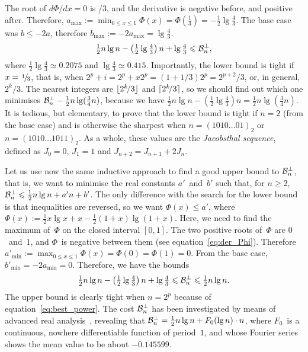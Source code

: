 The root of \(d\Phi/dx = 0\) is /{3}, and the derivative is
negative before, and positive after. Therefore, \(a_{\max} := \min_{0
  \leqslant x \leqslant 1}\Phi(x) = \Phi(\tfrac{1}{3}) =
-\tfrac{1}{2}\lg\tfrac{4}{3}\). The base case was \(b \leqslant -2a\),
therefore \(b_{\max} := -2a_{\max} = \lg\tfrac{4}{3}\).
\begin{equation}
  \tfrac{1}{2}n\lg n - \left(\tfrac{1}{2}\lg\tfrac{4}{3}\right)n + \lg\tfrac{4}{3}
  \leqslant \mathcal{B}_{n}^{\bot},
  \label{ineq:lower_Btms}
\end{equation}
where \(\tfrac{1}{2}\lg\tfrac{4}{3} \simeq 0.2075\) and
\(\lg\tfrac{4}{3} \simeq 0.415\). Importantly, the lower bound is
tight if \(x=\myfrac{1}/{3}\), that is, when
\(2^p+i=2^p+x2^p=(1+1/3)2^p=2^{p+2}\!/3\), or, in general,
\(2^k\!/3\). The nearest integers are \(\lfloor{2^k\!/3}\rfloor\) and
\(\lceil{2^k\!/3}\rceil\), so we should find out which one minimises
\(\mathcal{B}_{n}^{\bot} - \tfrac{1}{2}n\lg(\tfrac{3}{4}n)\), because we have
\(\tfrac{1}{2}n\lg n - \left(\tfrac{1}{2}\lg\tfrac{4}{3}\right)n =
\tfrac{1}{2}n\lg(\tfrac{3}{4}n)\). It is tedious, but elementary, to
prove that the lower bound is tight if \(n=2\) (from the base case)
and is otherwise the sharpest when \(n=(1010\dots01)_2\) or
\(n=(1010\dots1011)_2\). As a whole, these values are the
\emph{Jacobsthal sequence}, defined as \(J_0 = 0\), \(J_1=1\) and
\(J_{n+2} = J_{n+1} + 2J_{n}\).

Let us use now the same inductive approach to find a good upper bound
to \(\mathcal{B}_{n}^{\bot}\), that is, we want to minimise the real constants
\(a'\)~and~\(b'\) such that, for \(n \geqslant 2\), \(\mathcal{B}_{n}^{\bot}
\leqslant \tfrac{1}{2}n\lg n + a'n + b'\). The only difference with
the search for the lower bound is that inequalities are reversed, so
we want \(\Phi(x) \leqslant a'\), where \(\Phi(x) := \tfrac{1}{2}x\lg
x + x - \tfrac{1}{2}(1+x)\lg(1+x)\). Here, we need to find the maximum
of~\(\Phi\) on the closed interval \([0,1]\). The two positive roots
of~\(\Phi\) are \(0\)~and~\(1\), and \(\Phi\)~is negative between them
(see equation~\eqref{eq:der_Phi}). Therefore \(a'_{\min} := \max_{0
  \leqslant x \leqslant 1}\Phi(x) = \Phi(0) = \Phi(1) = 0\). From the
base case, \(b'_{\min} = -2a_{\min} = 0\). Therefore, we have the
bounds
\begin{equation}
\tfrac{1}{2}n\lg n - \left(\tfrac{1}{2}\lg\tfrac{4}{3}\right)n + \lg\tfrac{4}{3}
\leqslant \mathcal{B}_{n}^{\bot} \leqslant
\tfrac{1}{2}n\lg n.
\label{ineq:bounds_Btms}
\end{equation}
The upper bound is clearly tight when \(n=2^p\) because of
equation~\eqref{eq:best_power}. The cost \(\mathcal{B}_{n}^{\bot}\) has been
investigated by means of advanced real analysis~\cite{Delange:1975},
revealing that \(\mathcal{B}_{n}^{\bot} = \tfrac{1}{2}n\lg n + F_0(\lg n) \cdot
n\), where \(F_0\)~is a continuous, nowhere differentiable function of
period~\(1\), and whose Fourier series shows the mean value to be
about \(-0.145599\).

